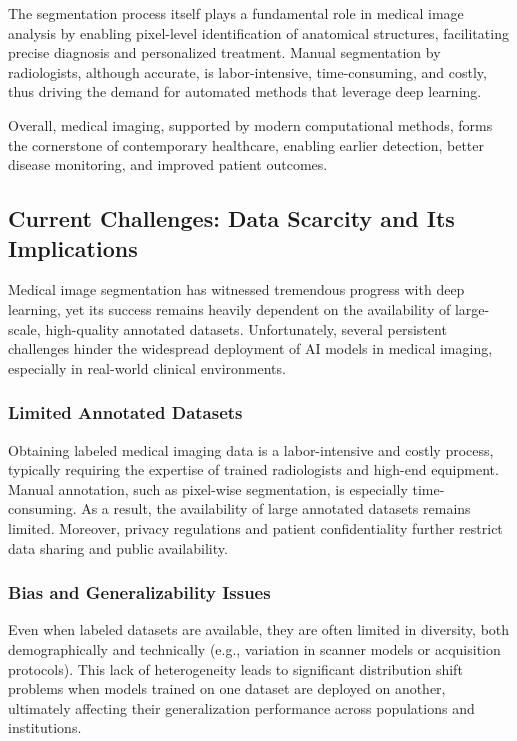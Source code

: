 \documentclass{article}
\begin{document}
The segmentation process itself plays a fundamental role in medical image analysis by enabling pixel-level identification of anatomical structures, facilitating precise diagnosis and personalized treatment​\cite{kumarTripleClippedHistogramBased2021}. Manual segmentation by radiologists, although accurate, is labor-intensive, time-consuming, and costly, thus driving the demand for automated methods that leverage deep learning​\cite{TAJBAKHSH2020101693}.

Overall, medical imaging, supported by modern computational methods, forms the cornerstone of contemporary healthcare, enabling earlier detection, better disease monitoring, and improved patient outcomes.

\subsection{Current Challenges: Data Scarcity and Its Implications}
Medical image segmentation has witnessed tremendous progress with deep learning, yet its success remains heavily dependent on the availability of large-scale, high-quality annotated datasets. Unfortunately, several persistent challenges hinder the widespread deployment of AI models in medical imaging, especially in real-world clinical environments.

\subsubsection{Limited Annotated Datasets}
Obtaining labeled medical imaging data is a labor-intensive and costly process, typically requiring the expertise of trained radiologists and high-end equipment. Manual annotation, such as pixel-wise segmentation, is especially time-consuming. As a result, the availability of large annotated datasets remains limited​. Moreover, privacy regulations and patient confidentiality further restrict data sharing and public availability​\cite{TAJBAKHSH2020101693}.

\subsubsection{Bias and Generalizability Issues}
Even when labeled datasets are available, they are often limited in diversity, both demographically and technically (e.g., variation in scanner models or acquisition protocols). This lack of heterogeneity leads to significant distribution shift problems when models trained on one dataset are deployed on another, ultimately affecting their generalization performance across populations and institutions​.
\end{document}
